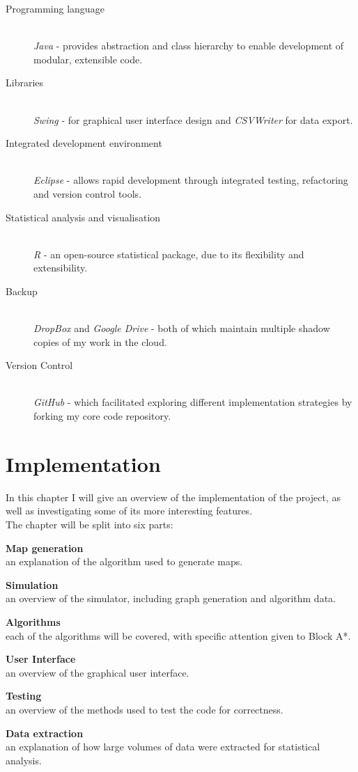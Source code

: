\documentclass[12pt,twoside,notitlepage]{report}
\begin{document}
\begin{description}
  \item[Programming language] \hfill \\
  {\em Java} - provides abstraction and class hierarchy to enable development of modular, extensible code.
  \item[Libraries] \hfill \\
  {\em Swing} - for graphical user interface design and {\em CSVWriter} for data export.
  \item[Integrated development environment] \hfill \\
  {\em Eclipse} - allows rapid development through integrated testing, refactoring and version control tools.
  \item[Statistical analysis and visualisation] \hfill \\
  {\em R} - an open-source statistical package, due to its flexibility and extensibility.
  \item[Backup] \hfill \\
  {\em DropBox} and {\em Google Drive} - both of which maintain multiple shadow copies of my work in the cloud.
  \item[Version Control]\hfill \\
  {\em GitHub} - which facilitated exploring different implementation strategies by forking my core code repository.
  
\end{description}

\cleardoublepage
\chapter{Implementation}

In this chapter I will give an overview of the implementation of the project, as well as investigating some of its more interesting features.\\

\noindent
The chapter will be split into six parts: 
\begin{description}
  \item{\bf Map generation}\\ \hfill  an explanation of the algorithm used to generate maps.
  \item{\bf Simulation}\\ \hfill an overview of the simulator, including graph generation and algorithm data.
  \item{\bf Algorithms}\\ \hfill each of the algorithms will be covered, with specific attention given to Block A*.
  \item{\bf User Interface}\\ \hfill an overview of the graphical user interface. 
  \item{\bf Testing}\\ \hfill an overview of the methods used to test the code for correctness.
  \item{\bf Data extraction}\\ \hfill an explanation of how large volumes of data were extracted for statistical analysis.
\end{description}
\end{document}
